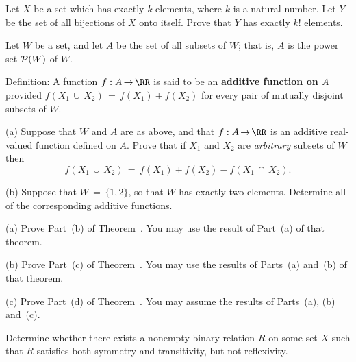 
\V
\V


\noindent \ExAk Let $X$ be a set which has exactly $k$ elements, where $k$ is a natural number.
    Let $Y$ be the set of all bijections of $X$ onto itself. Prove that $Y$ has exactly $k!$ elements.

\V
\V

\noindent \ExAl Let $W$ be a set, and let $A$ be the set of all subsets of $W$; that is, $A$ is the power set ${\cal P}(W)$ of $W$.

        \underline{Definition}: A function $f:A \,{\rightarrow}\, {\RR}$ is said to  be an {\bf additive function on $A$} provided
    $f(X_{1}\,{\cup}\,X_{2}) \,=\, f(X_{1}) + f(X_{2})$ for every pair of mutually disjoint subsets of $W$.

\V

        (a) Suppose that $W$ and $A$ are as above, and that $f:A \,{\rightarrow}\, {\RR}$ is an additive real-valued function defined on $A$.
    Prove that if $X_{1}$ and $X_{2}$ are {\em arbitrary} subsets of $W$ then
        \begin{displaymath}
        f(X_{1}\,{\cup}\,X_{2}) \,=\, f(X_{1}) + f(X_{2}) - f(X_{1}\,{\cap}\,X_{2}).
        \end{displaymath}


\V

        (b) Suppose that $W \,=\, \{1,2\}$, so that $W$ has exactly two elements.
    Determine all of the corresponding additive functions.




\V
\V

\noindent  \ExAm(a) Prove Part~(b) of Theorem~. You may use the result of Part~(a) of that theorem.

\V

        (b) Prove Part~(c) of Theorem~. You may use the results of Parts~(a) and~(b) of that theorem.

\V

       (c) Prove Part~(d) of Theorem~. You may assume the results of Parts~(a), (b) and~(c).
       
\V
\V

\noindent \ExAn Determine whether there exists a nonempty binary relation $R$ on some set $X$ such that $R$ satisfies both symmetry and transitivity, but not reflexivity.

